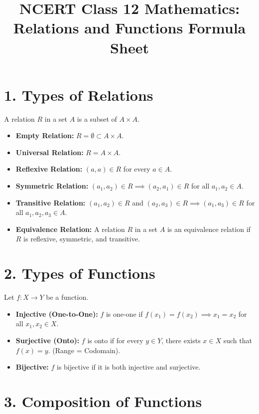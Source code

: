 \documentclass[12pt, a4paper]{article}
\title{NCERT Class 12 Mathematics: Relations and Functions Formula Sheet}
\author{}
\date{}
\begin{document}
\maketitle

\section*{1. Types of Relations}

A relation $R$ in a set $A$ is a subset of $A \times A$.

\begin{itemize}
    \item \textbf{Empty Relation:} $R = \emptyset \subset A \times A$.
    \item \textbf{Universal Relation:} $R = A \times A$.
    \item \textbf{Reflexive Relation:} $(a, a) \in R$ for every $a \in A$.
    \item \textbf{Symmetric Relation:} $(a_1, a_2) \in R \implies (a_2, a_1) \in R$ for all $a_1, a_2 \in A$.
    \item \textbf{Transitive Relation:} $(a_1, a_2) \in R$ and $(a_2, a_3) \in R \implies (a_1, a_3) \in R$ for all $a_1, a_2, a_3 \in A$.
    \item \textbf{Equivalence Relation:} A relation $R$ in a set $A$ is an equivalence relation if $R$ is reflexive, symmetric, and transitive.
\end{itemize}

\section*{2. Types of Functions}

Let $f: X \to Y$ be a function.

\begin{itemize}
    \item \textbf{Injective (One-to-One):} $f$ is one-one if $f(x_1) = f(x_2) \implies x_1 = x_2$ for all $x_1, x_2 \in X$.
    \item \textbf{Surjective (Onto):} $f$ is onto if for every $y \in Y$, there exists $x \in X$ such that $f(x) = y$. (Range = Codomain).
    \item \textbf{Bijective:} $f$ is bijective if it is both injective and surjective.
\end{itemize}

\section*{3. Composition of Functions}
\end{document}

